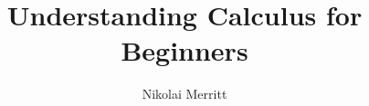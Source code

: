 \documentclass[11pt, leqno]{article}
\author{Nikolai Merritt}
\title{Understanding Calculus for Beginners}
\date{\vspace{-5ex}}
\numberwithin{equation}{section}
\begin{document}
\makeatletter
\newif\if@gather@prefix 
\preto\place@tag@gather{%
	\if@gather@prefix\iftagsleft@ 
	\kern-\gdisplaywidth@ 
	\rlap{\gather@prefix}%
	\kern\gdisplaywidth@ 
	\fi\fi 
} 
\appto\place@tag@gather{%
	\if@gather@prefix\iftagsleft@\else 
	\kern-\displaywidth 
	\rlap{\gather@prefix}%
	\kern\displaywidth 
	\fi\fi 
	\global\@gather@prefixfalse 
} 
\preto\place@tag{%
	\if@gather@prefix\iftagsleft@ 
	\kern-\gdisplaywidth@ 
	\rlap{\gather@prefix}%
	\kern\displaywidth@ 
	\fi\fi 
} 
\appto\place@tag{%
	\if@gather@prefix\iftagsleft@\else 
	\kern-\displaywidth 
	\rlap{\gather@prefix}%
	\kern\displaywidth 
	\fi\fi 
	\global\@gather@prefixfalse 
} 
\def\math@cr@@@align{%
	\ifst@rred\nonumber\fi
	\if@eqnsw \global\tag@true \fi
	\global\advance\row@\@ne
	\add@amps\maxfields@
	\omit
	\kern-\alignsep@
	\if@gather@prefix\tag@true\fi
	\iftag@
	\setboxz@h{\@lign\strut@{\make@display@tag}}%
	\place@tag
	\fi
	\ifst@rred\else\global\@eqnswtrue\fi
	\global\lineht@\z@
	\cr
}
\newcommand*{\beforetext}[1]{%
	\ifmeasuring@\else
	\gdef\gather@prefix{#1}%
	\global\@gather@prefixtrue 
	\fi
} 
\makeatother	
	
\newcommand{\Diff}[1] {\mathop{\text{d}#1}}
\newcommand{\Deriv}[2] {\frac{ \Diff{#1} }{ \Diff{#2} }}
\newcommand{\DelFrac}[2]{\frac{\Delta #1}{\Delta #2}}
\newcommand{\LimDeriv}[2]{ \lim_{\Delta #2 \to 0} \frac{#1(#2 + \Delta #2) - #1(#2)}{\Delta #2} }
\newcommand{\NthDeriv}[3]{\frac{ \text{d}^{#3} #1} {\text{d} #2^{#3}}}
\newcommand{\OutsideDeriv}[2]{\frac{ \text{d} }{ \text{d} #2 } \left( #1 \right)}
\newcommand{\asreq}{\textrm{, as required.} \qed}
\newcommand{\fs}{\, .}
\newcommand{\nn}{\\ \nonumber \\}
\maketitle

\newpage
\tableofcontents

\newpage
\end{document}
